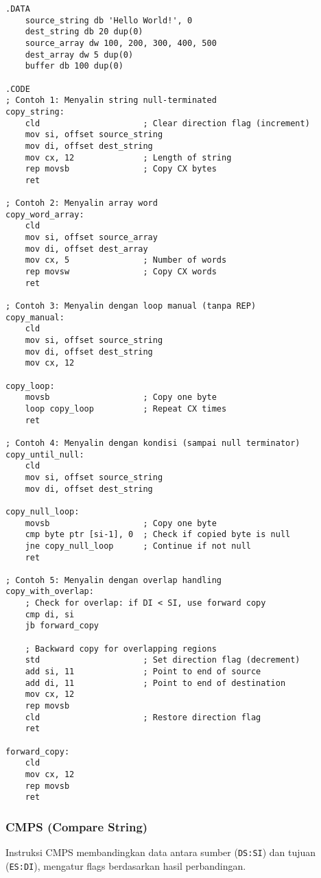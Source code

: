 \documentclass[../main.tex]{subfiles}
\begin{document}
                \begin{lstlisting}[language={[x86masm]Assembler}, caption=Contoh Instruksi MOVS, label={lst:movs-examples}]
.DATA
    source_string db 'Hello World!', 0
    dest_string db 20 dup(0)
    source_array dw 100, 200, 300, 400, 500
    dest_array dw 5 dup(0)
    buffer db 100 dup(0)

.CODE
; Contoh 1: Menyalin string null-terminated
copy_string:
    cld                     ; Clear direction flag (increment)
    mov si, offset source_string
    mov di, offset dest_string
    mov cx, 12              ; Length of string
    rep movsb               ; Copy CX bytes
    ret

; Contoh 2: Menyalin array word
copy_word_array:
    cld
    mov si, offset source_array
    mov di, offset dest_array
    mov cx, 5               ; Number of words
    rep movsw               ; Copy CX words
    ret

; Contoh 3: Menyalin dengan loop manual (tanpa REP)
copy_manual:
    cld
    mov si, offset source_string
    mov di, offset dest_string
    mov cx, 12
    
copy_loop:
    movsb                   ; Copy one byte
    loop copy_loop          ; Repeat CX times
    ret

; Contoh 4: Menyalin dengan kondisi (sampai null terminator)
copy_until_null:
    cld
    mov si, offset source_string
    mov di, offset dest_string
    
copy_null_loop:
    movsb                   ; Copy one byte
    cmp byte ptr [si-1], 0  ; Check if copied byte is null
    jne copy_null_loop      ; Continue if not null
    ret

; Contoh 5: Menyalin dengan overlap handling
copy_with_overlap:
    ; Check for overlap: if DI < SI, use forward copy
    cmp di, si
    jb forward_copy
    
    ; Backward copy for overlapping regions
    std                     ; Set direction flag (decrement)
    add si, 11              ; Point to end of source
    add di, 11              ; Point to end of destination
    mov cx, 12
    rep movsb
    cld                     ; Restore direction flag
    ret
    
forward_copy:
    cld
    mov cx, 12
    rep movsb
    ret
                \end{lstlisting}

            \subsubsection{CMPS (Compare String)}
                Instruksi CMPS membandingkan data antara sumber (\texttt{DS:SI}) dan tujuan (\texttt{ES:DI}), mengatur flags berdasarkan hasil perbandingan.
\end{document}
